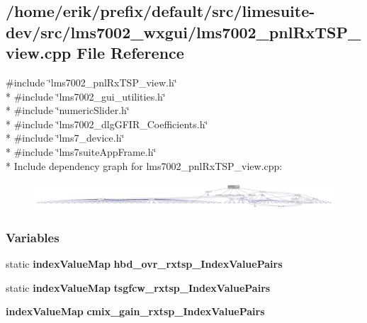 \subsection{/home/erik/prefix/default/src/limesuite-\/dev/src/lms7002\+\_\+wxgui/lms7002\+\_\+pnl\+Rx\+T\+S\+P\+\_\+view.cpp File Reference}
\label{lms7002__pnlRxTSP__view_8cpp}
{\ttfamily \#include \char`\"{}lms7002\+\_\+pnl\+Rx\+T\+S\+P\+\_\+view.\+h\char`\"{}}\\*
{\ttfamily \#include \char`\"{}lms7002\+\_\+gui\+\_\+utilities.\+h\char`\"{}}\\*
{\ttfamily \#include \char`\"{}numeric\+Slider.\+h\char`\"{}}\\*
{\ttfamily \#include \char`\"{}lms7002\+\_\+dlg\+G\+F\+I\+R\+\_\+\+Coefficients.\+h\char`\"{}}\\*
{\ttfamily \#include \char`\"{}lms7\+\_\+device.\+h\char`\"{}}\\*
{\ttfamily \#include \char`\"{}lms7suite\+App\+Frame.\+h\char`\"{}}\\*
Include dependency graph for lms7002\+\_\+pnl\+Rx\+T\+S\+P\+\_\+view.\+cpp\+:
\nopagebreak
\begin{figure}[H]
\begin{center}
\leavevmode
\includegraphics[width=350pt]{d4/def/lms7002__pnlRxTSP__view_8cpp__incl}
\end{center}
\end{figure}
\subsubsection*{Variables}
\begin{DoxyCompactItemize}
\item 
static {\bf index\+Value\+Map} {\bf hbd\+\_\+ovr\+\_\+rxtsp\+\_\+\+Index\+Value\+Pairs}
\item 
static {\bf index\+Value\+Map} {\bf tsgfcw\+\_\+rxtsp\+\_\+\+Index\+Value\+Pairs}
\item 
{\bf index\+Value\+Map} {\bf cmix\+\_\+gain\+\_\+rxtsp\+\_\+\+Index\+Value\+Pairs}
\end{DoxyCompactItemize}


